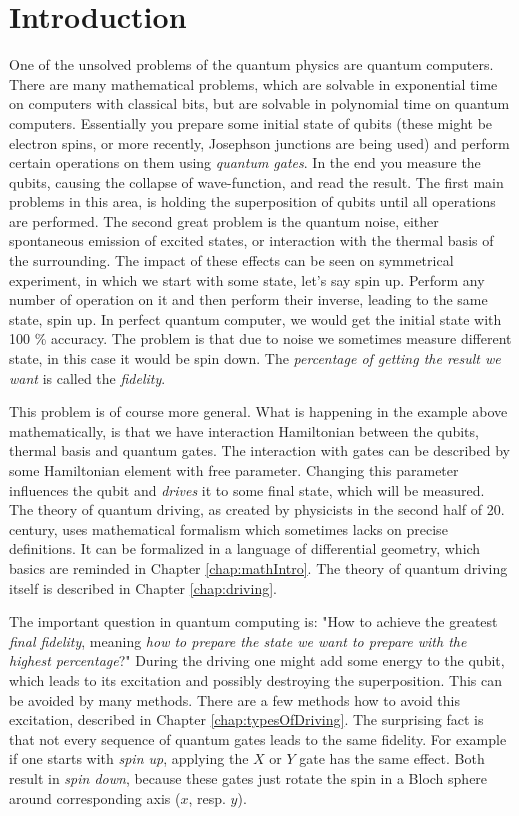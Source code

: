 \chapter*{Introduction}
One of the unsolved problems of the quantum physics are quantum computers. There are many mathematical problems, which are solvable in exponential time on computers with classical bits, but are solvable in polynomial time on quantum computers. Essentially you prepare some initial state of qubits (these might be electron spins, or more recently, Josephson junctions are being used) and perform certain operations on them using \emph{quantum gates}. In the end you measure the qubits, causing the collapse of wave-function, and read the result. The first main problems in this area, is holding the superposition of qubits until all operations are performed. The second great problem is the quantum noise, either spontaneous emission of excited states, or interaction with the thermal basis of the surrounding. The impact of these effects can be seen on symmetrical experiment, in which we start with some state, let's say spin up. Perform any number of operation on it and then perform their inverse, leading to the same state, spin up. In perfect quantum computer, we would get the initial state with 100 \% accuracy. The problem is that due to noise we sometimes measure different state, in this case it would be spin down. The \emph{percentage of getting the result we want} is called the \emph{fidelity}.

This problem is of course more general. What is happening in the example above mathematically, is that we have interaction Hamiltonian between the qubits, thermal basis and quantum gates. The interaction with gates can be described by some Hamiltonian element with free parameter. Changing this parameter influences the qubit and \emph{drives} it to some final state, which will be measured. The theory of quantum driving, as created by physicists in the second half of 20. century, uses mathematical formalism which sometimes lacks on precise definitions. It can be formalized in a language of differential geometry, which basics are reminded in Chapter \ref{chap:mathIntro}. The theory of quantum driving itself is described in Chapter \ref{chap:driving}.

The important question in quantum computing is: "How to achieve the greatest \emph{final fidelity}, meaning \emph{how to prepare the state we want to prepare with the highest percentage}?" During the driving one might add some energy to the qubit, which leads to its excitation and possibly destroying the superposition. This can be avoided by many methods. There are a few methods how to avoid this excitation, described in Chapter \ref{chap:typesOfDriving}. The surprising fact is that not every sequence of quantum gates leads to the same fidelity. For example if one starts with \emph{spin up}, applying the $X$ or $Y$ gate has the same effect. Both result in \emph{spin down}, because these gates just rotate the spin in a Bloch sphere around corresponding axis ($x$, resp. $y$).





